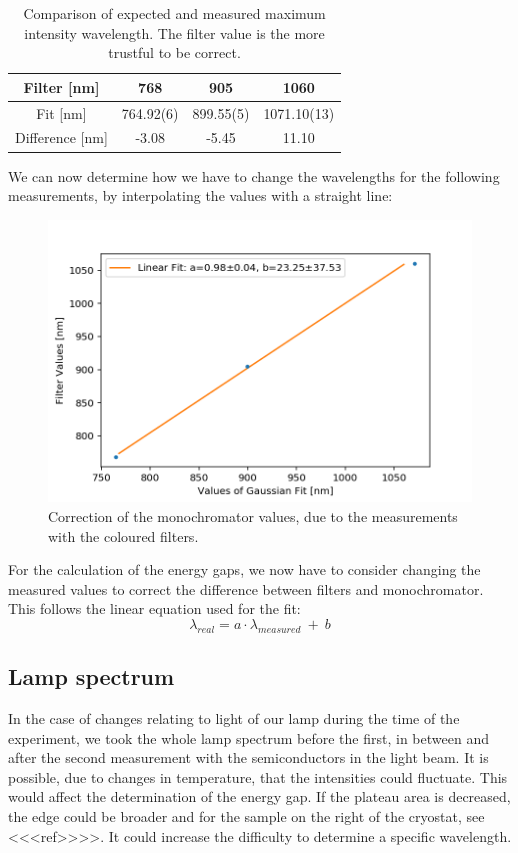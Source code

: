 \documentclass[]{article}
\begin{document}
\begin{table}[H]
	\centering
	\begin{tabular}{c|c|c|c}
	Filter [nm] & 768 & 905 & 1060 \\ \hline
	Fit [nm] & 764.92(6) & 899.55(5) & 1071.10(13) \\ \hline
	Difference [nm] & -3.08 & -5.45 & 11.10
	\end{tabular}
	\caption{Comparison of expected and measured maximum intensity wavelength. The filter value is the more trustful to be correct.}
\end{table}

We can now determine how we have to change the wavelengths for the following measurements, by interpolating the values with a straight line:

\begin{figure}[H]
\centering
\includegraphics[width=.9\textwidth]{Plots/LambdaCorrection.png}
\caption{Correction of the monochromator values, due to the measurements with the coloured filters.}
\label{fig:LambdaCorrection}
\end{figure}

For the calculation of the energy gaps, we now have to consider changing the measured values to correct the difference between filters and monochromator. This follows the linear equation used for the fit: 
\begin{equation}
\lambda_{real} = a\cdot \lambda_{measured} \ + \ b
\end{equation}

\subsection{Lamp spectrum} \label{lamp spectrum}
In the case of changes relating to light of our lamp during the time of the experiment, we took the whole lamp spectrum before the first, in between and after the second measurement with the semiconductors in the light beam. It is possible, due to changes in temperature, that the intensities could fluctuate. This would affect the determination of the energy gap. If the plateau area is decreased, the edge could be broader and for the sample on the right of the cryostat, see <<<ref>>>>. It could increase the difficulty to determine a specific wavelength.
\end{document}
